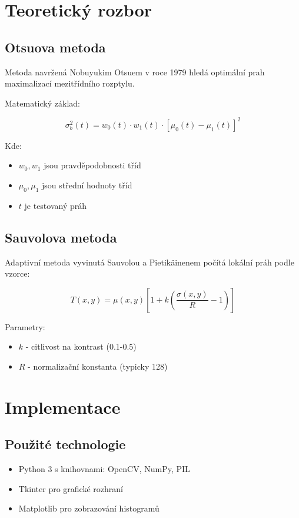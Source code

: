 \documentclass[12pt,a4paper]{article}
\begin{document}
\section{Teoretický rozbor}

\subsection{Otsuova metoda}
Metoda navržená Nobuyukim Otsuem v roce 1979 hledá optimální prah maximalizací mezitřídního rozptylu.

Matematický základ:

\begin{equation}
\sigma_b^2(t) = w_0(t) \cdot w_1(t) \cdot [\mu_0(t) - \mu_1(t)]^2
\end{equation}

Kde:
\begin{itemize}
\item $w_0, w_1$ jsou pravděpodobnosti tříd
\item $\mu_0, \mu_1$ jsou střední hodnoty tříd
\item $t$ je testovaný práh
\end{itemize}

\subsection{Sauvolova metoda}
Adaptivní metoda vyvinutá Sauvolou a Pietikäinenem počítá lokální práh podle vzorce:

\begin{equation}
T(x,y) = \mu(x,y) \left[ 1 + k \left( \frac{\sigma(x,y)}{R} - 1 \right) \right]
\end{equation}

Parametry:
\begin{itemize}
\item $k$ - citlivost na kontrast (0.1-0.5)
\item $R$ - normalizační konstanta (typicky 128)
\end{itemize}

\section{Implementace}

\subsection{Použité technologie}
\begin{itemize}
\item Python 3 s knihovnami: OpenCV, NumPy, PIL
\item Tkinter pro grafické rozhraní
\item Matplotlib pro zobrazování histogramů
\end{itemize}
\end{document}
